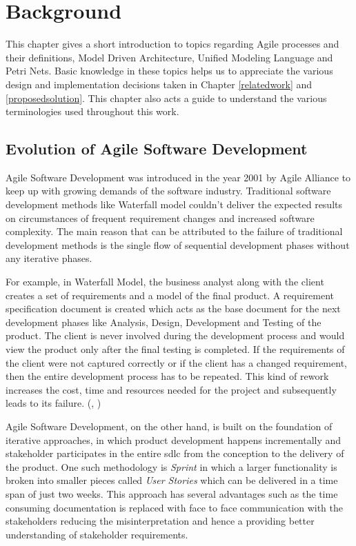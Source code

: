 \chapter{Background}\label{background} 
This chapter gives a short introduction to topics regarding Agile processes and their definitions, Model Driven Architecture, Unified Modeling Language and Petri Nets. Basic knowledge in these topics helps us to appreciate the various design and implementation decisions taken in Chapter \ref{relatedwork} and \ref{proposedsolution}. This chapter also acts a guide to understand the various terminologies used throughout this work.

\section{Evolution of Agile Software Development}
Agile Software Development was introduced in the year 2001 by Agile Alliance to keep up with growing demands of the software industry. Traditional software development methods like Waterfall model couldn’t deliver the expected results on circumstances of frequent requirement changes and increased software complexity. The main reason that can be attributed to the failure of traditional development methods is the single flow of sequential development phases without any iterative phases.

For example, in Waterfall Model, the business analyst along with the client creates a set of requirements and a model of the final product. A requirement specification document is created which acts as the base document for the next development phases like Analysis, Design, Development and Testing of the product. The client is never involved during the development process and would view the product only after the final testing is completed. If the requirements of the client were not captured correctly or if the client has a changed requirement, then the entire development process has to be repeated. This kind of rework increases the cost, time and resources needed for the project and subsequently leads to its failure. (\cite{versionone}, \cite{getzephyr})

Agile Software Development, on the other hand, is built on the foundation of iterative approaches, in which product development happens incrementally and stakeholder participates in the entire \gls{sdlc} from the conception to the delivery of the product. One such methodology is \textit{Sprint} in which a larger functionality is broken into smaller pieces called \textit{User Stories} which can be delivered in a time span of just two weeks. This approach has several advantages such as the time consuming documentation is replaced with face to face communication with the stakeholders reducing the misinterpretation and hence a providing better understanding of stakeholder requirements.

